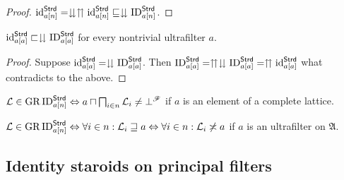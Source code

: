 \begin{proof}
$\operatorname{id}_{a[n]}^{\mathsf{Strd}}=\downdownarrows\upuparrows\operatorname{id}_{a[n]}^{\mathsf{Strd}}\sqsubseteq\downdownarrows\operatorname{ID}_{a[n]}^{\mathsf{Strd}}$.\end{proof}
\begin{prop}
$\operatorname{id}_{a[a]}^{\mathsf{Strd}}\sqsubset\downdownarrows\operatorname{ID}_{a[a]}^{\mathsf{Strd}}$
for every nontrivial ultrafilter $a$.\end{prop}
\begin{proof}
Suppose $\operatorname{id}_{a[a]}^{\mathsf{Strd}}=\downdownarrows\operatorname{ID}_{a[a]}^{\mathsf{Strd}}$.
Then $\operatorname{ID}_{a[a]}^{\mathsf{Strd}}=\upuparrows\downdownarrows\operatorname{ID}_{a[a]}^{\mathsf{Strd}}=\upuparrows\operatorname{id}_{a[a]}^{\mathsf{Strd}}$
what contradicts to the above.\end{proof}
\begin{obvious}
$\mathcal{L}\in\operatorname{GR}\operatorname{ID}_{a[n]}^{\mathsf{Strd}}\Leftrightarrow a\sqcap\bigsqcap_{i\in n}\mathcal{L}_{i}\neq\bot^{\mathscr{F}}$
if $a$ is an element of a complete lattice.
\end{obvious}

\begin{obvious}
$\mathcal{L}\in\operatorname{GR}\operatorname{ID}_{a[n]}^{\mathsf{Strd}}\Leftrightarrow\forall i\in n:\mathcal{L}_{i}\sqsupseteq a\Leftrightarrow\forall i\in n:\mathcal{L}_{i}\not\asymp a$
if $a$ is an ultrafilter on $\mathfrak{A}$.
\end{obvious}

\subsection{Identity staroids on principal filters}

